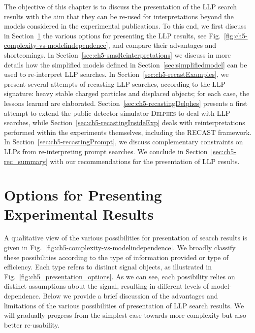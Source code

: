The objective of this chapter is to discuss the presentation of the LLP search results  
with the aim that they can be re-used for interpretations beyond the models considered in the 
experimental publications.  
To this end, we first discuss in Section~\ref{sec:ch5-options} the various options 
for presenting the LLP results, see Fig.~\ref{fig:ch5-complexity-vs-modelindependence}, and compare their advantages and
shortcomings. 
In Section~\ref{sec:ch5-smsReinterpretations} we discuss in more details how the simplified models defined in Section~\ref{sec:simplifiedmodel} can be used to re-interpret LLP searches. 
In Section~\ref{sec:ch5-recastExamples}, we present several attempts of recasting LLP searches, 
according to the LLP signature: heavy stable charged particles and displaced objects; for each case, 
the lessons learned are elaborated. 
Section~\ref{sec:ch5-recastingDelphes} presents a first attempt to
extend the public detector simulator \textsc{Delphes} %
to deal with LLP searches, while 
Section~\ref{sec:ch5-recastingInsideExp} deals with reinterpretations performed within the experiments themselves, 
including the RECAST framework.  
In Section~\ref{sec:ch5-recastingPrompt}, we discuss complementary constraints on LLPs from re-interpreting prompt searches. 
We conclude in Section~\ref{sec:ch5-rec_summary} with our %
recommendations for the presentation of LLP results. 


\section{Options for Presenting Experimental Results} 
\label{sec:ch5-options}

A qualitative view of the various possibilities for presentation
of search results is given in
Fig.~\ref{fig:ch5-complexity-vs-modelindependence}.
We broadly classify these possibilities according to the type of
information provided or type of efficiency.
Each type refers to distinct signal objects, as illustrated in
Fig.~\ref{fig:ch5_presentation_options}.
As we can see, each possibility relies on distinct assumptions about
the signal, resulting in different levels of model-dependence.
Below we provide a brief discussion of the advantages and limitations of the
various possibilities of presentation of LLP search results.
We will gradually progress from the simplest case towards more complexity but
also better re-usability.


